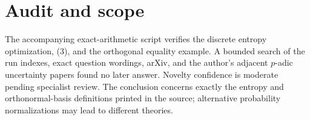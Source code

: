 \documentclass[11pt]{article}
\begin{document}
\section*{Audit and scope}
The accompanying exact-arithmetic script verifies the discrete entropy
optimization, (3), and the orthogonal equality example.  A bounded search of
the run indexes, exact question wordings, arXiv, and the author's adjacent
$p$-adic uncertainty papers found no later answer.  Novelty confidence is
moderate pending specialist review.  The conclusion concerns exactly the
entropy and orthonormal-basis definitions printed in the source; alternative
probability normalizations may lead to different theories.
\end{document}
